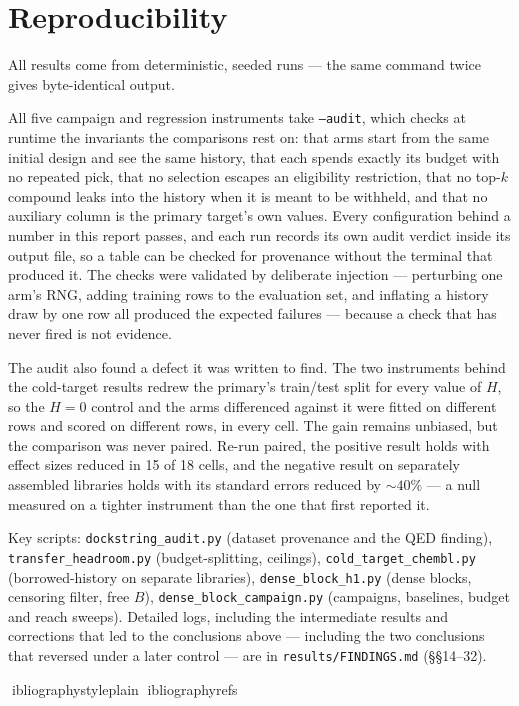 \documentclass[11pt]{article}
\begin{document}
\section*{Reproducibility}
\label{sec:repro}

All results come from deterministic, seeded runs --- the same command twice
gives byte-identical output.

All five campaign and regression instruments take \texttt{--audit}, which checks
at runtime the invariants the comparisons rest on: that arms start from the same
initial design and see the same history, that each spends exactly its budget
with no repeated pick, that no selection escapes an eligibility restriction,
that no top-$k$ compound leaks into the history when it is meant to be
withheld, and that no auxiliary column is the primary target's own values.
Every configuration behind a number in this report passes, and each run records
its own audit verdict inside its output file, so a table can be checked for
provenance without the terminal that produced it. The checks were validated by
deliberate injection --- perturbing one arm's RNG, adding training rows to the
evaluation set, and inflating a history draw by one row all produced the
expected failures --- because a check that has never fired is not evidence.

The audit also found a defect it was written to find. The two instruments behind
the cold-target results redrew the primary's train/test split for every value of
$H$, so the $H = 0$ control and the arms differenced against it were fitted on
different rows and scored on different rows, in every cell. The gain remains
unbiased, but the comparison was never paired. Re-run paired, the positive
result holds with effect sizes reduced in 15 of 18 cells, and the negative
result on separately assembled libraries holds with its standard errors reduced
by ${\sim}40\%$ --- a null measured on a tighter instrument than the one that
first reported it.

Key scripts:
\texttt{dockstring\_audit.py} (dataset provenance and the QED finding),
\texttt{transfer\_headroom.py} (budget-splitting, ceilings),
\texttt{cold\_target\_chembl.py} (borrowed-history on separate libraries),
\texttt{dense\_block\_h1.py} (dense blocks, censoring filter, free $B$),
\texttt{dense\_block\_campaign.py} (campaigns, baselines, budget and reach
sweeps). Detailed logs, including the intermediate results and corrections that
led to the conclusions above --- including the two conclusions that reversed
under a later control --- are in \texttt{results/FINDINGS.md} (\S\S14--32).

ibliographystyle{plain}
ibliography{refs}



\end{document}
